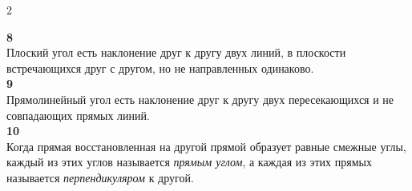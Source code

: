 \documentclass{article}
\begin{document}
\begin{paracol}{2}
\begin{center}
\textbf{8} \\
Плоский угол есть наклонение друг к другу двух линий, в плоскости встречающихся друг с другом, но не направленных одинаково. \\[1em]

\textbf{9} \\  
Прямолинейный угол есть наклонение друг к другу двух пересекающихся и не совпадающих прямых линий. \\[1em]

\textbf{10} \\
Когда прямая восстановленная на другой прямой образует равные смежные углы, каждый из этих углов называется \textit{прямым углом}, а каждая из этих прямых называется \textit{перпендикуляром} к другой.


\end{center}

\end{paracol}
\end{document}
